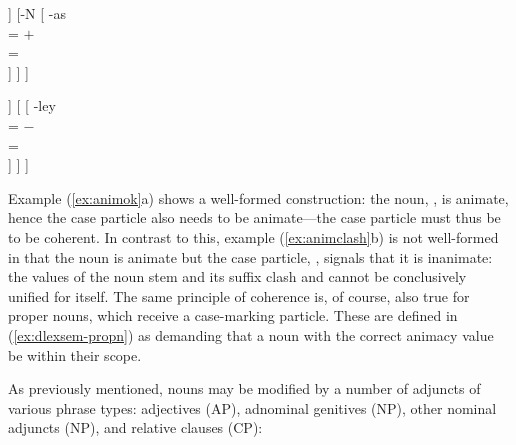 \ex{}%
\begin{minipage}[t]{.5\linewidth}
\tl\label{ex:animok}\quad %
\begin{forest}
[{%
\xhead{N} \\
\ups{\Anim} = $+$ \\
\ups{\Case} = \Parg{}
}
	[N\tsub{stem}
		[{%
			gan \\
			\ups{\Anim} = $+$ \\
		}]
	]
	[-N
		[{%
			-as \\
			\ups{\Anim} = $+$ \\
			\ups{\Case} = \Parg{} \\
		}]
	]
]
\end{forest}
\end{minipage}
\begin{minipage}[t]{.5\linewidth}
\tl\label{ex:animclash}\quad %
\ljudge*\begin{forest}
[{%
\xhead{N} \\
\ups{\Anim} = \err{} \\
\ups{\Case} = \Parg{}
}
	[N\tsub{stem}
		[{%
			gan \\
			\ups{\Anim} = $+$ \\
		}]
	]
	[
		[{%
			-ley \\
			\ups{\Anim} = $-$ \\
			\ups{\Case} = \Parg{} \\
		}]
	]
]
\end{forest}
\end{minipage}
\xe

Example (\ref{ex:animok}a) shows a well-formed construction: the noun, 
, is animate, hence the case particle also needs to be 
animate---the case particle must thus be  to be coherent. In 
contrast to this, example (\ref{ex:animclash}b) is not well-formed in that the 
noun is animate but the case particle, , signals that 
it is inanimate: the \Anim{} values of the noun stem and its suffix 
clash and cannot be conclusively unified for  itself. The 
same principle of coherence is, of course, also true for proper nouns, which 
receive a case-marking particle. These are defined in (\ref{ex:dlexsem-propn}) 
as demanding that a noun with the correct animacy value be within their scope.

As previously mentioned, nouns may be modified by a number of adjuncts of
various phrase types: adjectives (AP), adnominal genitives (NP), other nominal 
adjuncts (NP), and relative clauses (CP):

